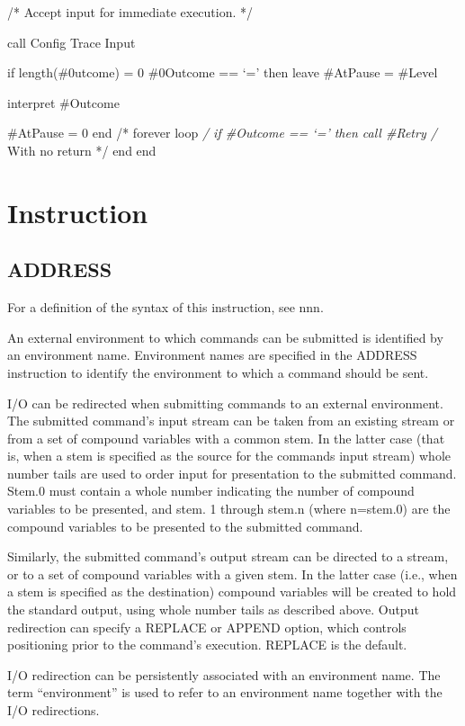 /* Accept input for immediate execution. */

call Config Trace Input

if length(\#0utcome) = 0 \textbar{} \#0Outcome == `=' then leave
\#AtPause = \#Level

interpret \#Outcome

\#AtPause = 0 end /* forever loop \emph{/ if \#Outcome == `=' then call
\#Retry /} With no return */ end end

\section{Instruction}\label{instruction}

\subsection{ADDRESS}\label{address}

For a definition of the syntax of this instruction, see nnn.

An external environment to which commands can be submitted is identified
by an environment name. Environment names are specified in the ADDRESS
instruction to identify the environment to which a command should be
sent.

I/O can be redirected when submitting commands to an external
environment. The submitted command's input stream can be taken from an
existing stream or from a set of compound variables with a common stem.
In the latter case (that is, when a stem is specified as the source for
the commands input stream) whole number tails are used to order input
for presentation to the submitted command. Stem.0 must contain a whole
number indicating the number of compound variables to be presented, and
stem. 1 through stem.n (where n=stem.0) are the compound variables to be
presented to the submitted command.

Similarly, the submitted command's output stream can be directed to a
stream, or to a set of compound variables with a given stem. In the
latter case (i.e., when a stem is specified as the destination) compound
variables will be created to hold the standard output, using whole
number tails as described above. Output redirection can specify a
REPLACE or APPEND option, which controls positioning prior to the
command's execution. REPLACE is the default.

I/O redirection can be persistently associated with an environment name.
The term ``environment'' is used to refer to an environment name
together with the I/O redirections.

